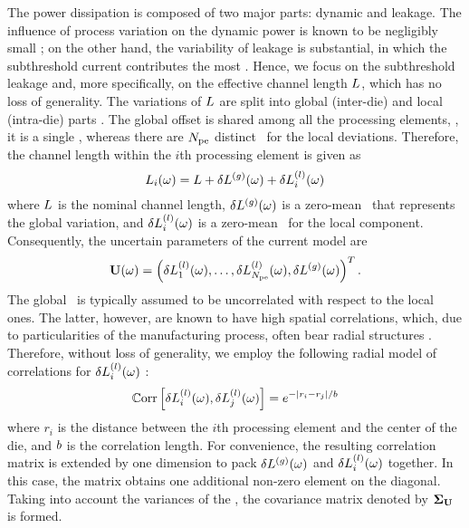 The power dissipation is composed of two major parts: dynamic and leakage. The influence of process variation on the dynamic power is known to be negligibly small \cite{juan2011, juan2012, srivastava2010}; on the other hand, the variability of leakage is substantial, in which the subthreshold current contributes the most \cite{juan2011, juan2012}. Hence, we focus on the subthreshold leakage and, more specifically, on the effective channel length $L$, which has no loss of generality. The variations of $L$ are split into global (inter-die) and local (intra-die) parts \cite{chandra2010, juan2011, juan2012, srivastava2010, shen2009}. The global offset is shared among all the processing elements, \ie, it is a single \rv, whereas there are ${N_\text{pe}}$ distinct \rvs\ for the local deviations. Therefore, the channel length within the $i$th processing element is given as
\[
  L_i(\omega) = L + {\delta L^{(g)}}(\omega) + \delta L^{(l)}_i(\omega)
\]
where $L$ is the nominal channel length, ${\delta L^{(g)}}(\omega)$ is a zero-mean \rv\ that represents the global variation, and $\delta L^{(l)}_i(\omega)$ is a zero-mean \rv\ for the local component. Consequently, the uncertain parameters of the current model are
\[
  \mathbf{U}(\omega) = \left(\delta L^{(l)}_1(\omega), \dotsc, \delta L^{(l)}_{N_\text{pe}}(\omega), {\delta L^{(g)}}(\omega) \right)^T.
\]
The global \rv\ is typically assumed to be uncorrelated with respect to the local ones. The latter, however, are known to have high spatial correlations, which, due to particularities of the manufacturing process, often bear radial structures \cite{friedberg2005, cheng2011}. Therefore, without loss of generality, we employ the following radial model of correlations for $\delta L^{(l)}_i(\omega)$ \cite{ghanem1991, ghanta2006}:
\begin{equation} \elabel{covariance-function}
  \oCorr{\lLeff_i(\o), \lLeff_j(\o)} = e^{-|r_i - r_j|/\corrLength}
\end{equation}
where $r_i$ is the distance between the $i$th processing element and the center of the die, and $b$ is the correlation length. For convenience, the resulting correlation matrix is extended by one dimension to pack ${\delta L^{(g)}}(\omega)$ and $\delta L^{(l)}_i(\omega)$ together. In this case, the matrix obtains one additional non-zero element on the diagonal. Taking into account the variances of the \rvs, the covariance matrix denoted by $\mCov_\vU$ is formed.
